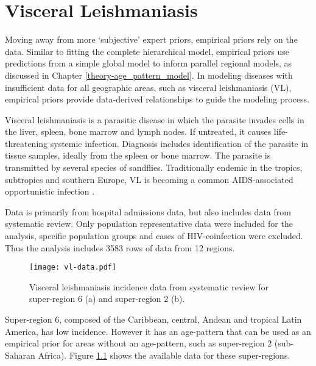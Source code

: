 \chapter{Visceral Leishmaniasis}
\label{applications-priors_empirical}

Moving away from more `subjective' expert priors, empirical priors rely on the data.  Similar to fitting the complete hierarchical model, empirical priors use predictions from a simple global model to inform parallel regional models, as discussed in Chapter \ref{theory-age_pattern_model}.  In modeling diseases with insufficient data for all geographic areas, such as visceral leishmaniasis (VL), empirical priors provide data-derived relationships to guide the modeling process.

Visceral leishmaniasis is a parasitic disease in which the parasite invades cells in the liver, spleen, bone marrow and lymph nodes.  If untreated, it causes life-threatening systemic infection.  Diagnosis includes identification of the parasite in tissue samples, ideally from the spleen or bone marrow.  The parasite is transmitted by several species of sandflies.  Traditionally  endemic in the tropics, subtropics and southern Europe, VL is becoming a common AIDS-associated opportunistic infection \cite{herwaldt_leishmaniasis_1999, zeledon_hemoflagellates_1996}.

Data is primarily from hospital admissions data, but also includes data from systematic review.  Only population representative data were included for the analysis, specific population groups and cases of HIV-coinfection were excluded.  Thus the analysis includes 3583 rows of data from 12 regions.

    \begin{figure}[h]
        \begin{center}
            \texttt{[image: vl-data.pdf]}
            \caption{Visceral leishmaniasis incidence data from systematic review for super-region 6 (a) and super-region 2 (b).}
            \label{fig:app-vl data}
        \end{center}
    \end{figure}

Super-region 6, composed of the Caribbean, central, Andean and tropical Latin America, has low incidence.  However it has an age-pattern that can be used as an empirical prior for areas without an age-pattern, such as super-region 2 (sub-Saharan Africa).  Figure \ref{fig:app-vl data} shows the available data for these super-regions.

